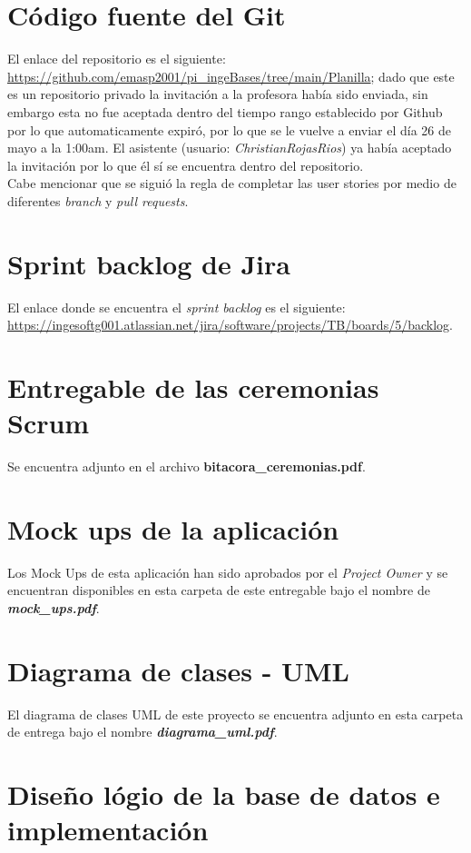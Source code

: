 \documentclass{article}
\begin{document}
\newpage


\newpage
\section{Código fuente del Git}
El enlace del repositorio es el siguiente: \url{https://github.com/emasp2001/pi_ingeBases/tree/main/Planilla};
dado que este es un repositorio privado la invitación a la profesora había sido enviada,
sin embargo esta no fue aceptada dentro del tiempo rango establecido por Github 
por lo que automaticamente expiró, por lo que se le vuelve a enviar el día
26 de mayo a la 1:00am. El asistente (usuario: \textit{ChristianRojasRios}) ya había aceptado la invitación por lo que él 
sí se encuentra dentro del repositorio.\\
Cabe mencionar que se siguió la regla de completar las user stories por medio de
diferentes \textit{branch} y \textit{pull requests}.

\section{Sprint backlog de Jira}
El enlace donde se encuentra el \textit{sprint backlog} es el siguiente: \url{https://ingesoftg001.atlassian.net/jira/software/projects/TB/boards/5/backlog}.

\section{Entregable de las ceremonias Scrum}
Se encuentra adjunto en el archivo \textbf{bitacora\_ceremonias.pdf}.

\section{Mock ups de la aplicación}
Los Mock Ups de esta aplicación han sido aprobados por el \textit{Project Owner} y se
encuentran disponibles en esta carpeta de este entregable bajo el nombre de \textbf{\textit{mock\_ups.pdf}}.

\section{Diagrama de clases - UML}
El diagrama de clases UML de este proyecto se encuentra adjunto en esta carpeta de
entrega bajo el nombre \textbf{\textit{diagrama\_uml.pdf}}.

\section{Diseño lógio de la base de datos e implementación}
\end{document}

